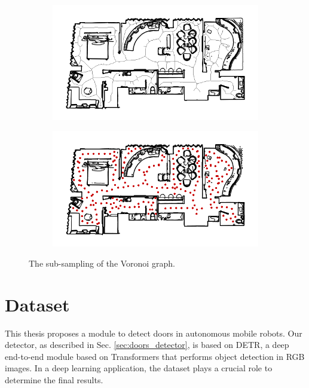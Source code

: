 \begin{figure}[h!]
	\centering
	\begin{subfigure}[b]{0.49\linewidth}
		\centering
		\includegraphics[width=\textwidth]{images/pose_estimator_skelethon_map.png}
		\caption{}
		\label{fig:pose_estimator_voronoi_graph}
	\end{subfigure}
	\hfil
	\begin{subfigure}[b]{0.49\linewidth}
		\centering
		\includegraphics[width=\textwidth]{images/pose_estimator_subsampled.png}
		\caption{}
		\label{fig:pose_estimator_subsampled}
	\end{subfigure}
	\caption{The sub-sampling of the Voronoi graph.}
\end{figure}

\section{Dataset}

This thesis proposes a module to detect doors in autonomous mobile robots. Our detector, as described in Sec. \ref{sec:doors_detector}, is based on DETR, a deep end-to-end module based on Transformers \cite{transformer} that performs object detection in RGB images. In a deep learning application, the dataset plays a crucial role to determine the final results. 


